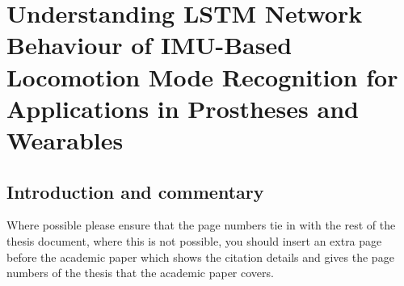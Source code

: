\chapter{Understanding LSTM Network Behaviour of IMU-Based Locomotion Mode Recognition for Applications in Prostheses and Wearables}

\section{Introduction and commentary}
Where possible please ensure that the page numbers tie in with the rest of the thesis document, 
where this is not possible, you should insert an extra page before the academic paper which shows 
the citation details and gives the page numbers of the thesis that the academic paper covers.

\clearpage
